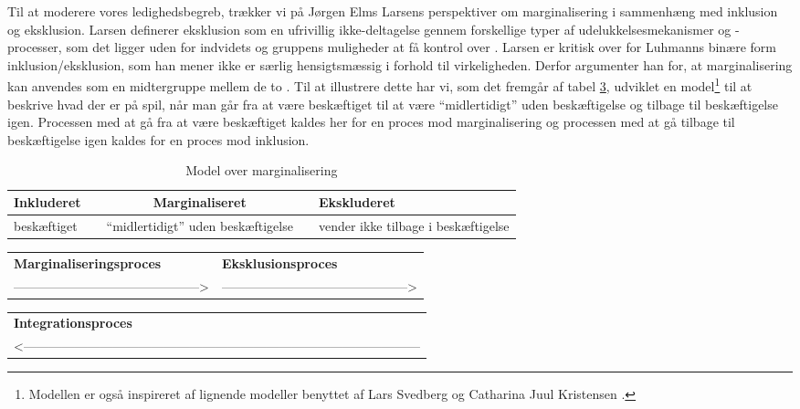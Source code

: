 Til at moderere vores ledighedsbegreb, trækker vi på Jørgen Elms Larsens perspektiver om  marginalisering i sammenhæng med inklusion og eksklusion. Larsen definerer eksklusion som en ufrivillig ikke-deltagelse gennem forskellige typer af udelukkelsesmekanismer og -processer, som det ligger uden for indvidets og gruppens muligheder at få kontrol over \parencite[237]{Larsen2009}. Larsen er kritisk over for Luhmanns binære form inklusion/eksklusion, som han mener ikke er særlig hensigtsmæssig i forhold til virkeligheden. Derfor argumenter han for, at marginalisering kan anvendes som en midtergruppe mellem de to \parencite[130f]{Larsen2009}. Til at illustrere dette har vi, som det fremgår af tabel \ref{tab_marginaliseringsmodel}, udviklet en model\footnote{Modellen er også inspireret af lignende modeller benyttet af Lars Svedberg \parencite[44]{Svedberg1995} og Catharina Juul Kristensen \parencite[18]{Kristensen1999}.} til at beskrive hvad der er på spil, når man går fra at være beskæftiget til at være “midlertidigt” uden beskæftigelse og tilbage til beskæftigelse igen. Processen med at gå fra at være beskæftiget kaldes her for en proces mod marginalisering og processen med at gå tilbage til beskæftigelse igen kaldes for en proces mod inklusion.
%
\begin{table}[H] \centering
\caption{Model over marginalisering}
\label{tab_marginaliseringsmodel}
\begin{tabular}{@{} m{} c m{4cm} c m{4cm} @{}} \toprule
\textbf{Inkluderet} & & \multicolumn{1}{c}{\textbf{Marginaliseret}} & & \textbf{Ekskluderet} \\ \midrule
  beskæftiget  & & “midlertidigt” uden beskæftigelse & & vender ikke tilbage i beskæftigelse \\  
\end{tabular} \end{table}
%
\begin{table}[H] \centering
\label{tab_marginaliseringsmodel}
\begin{tabular}{@{} m{} m{} @{}} 
  \textbf{Marginaliseringsproces} & \textbf{Eksklusionsproces} \\  
  --------------------------------------------> & --------------------------------------------> \\ 
\end{tabular} \end{table}
%
%
\begin{table}[H] \centering
\label{tab_marginaliseringsmodel}
\begin{tabular}{@{} m{} @{}} 
  \textbf{Integrationsproces} \\  
  <--------------------------------------------------------------------------------------------- \\ \bottomrule
\end{tabular} \end{table}
